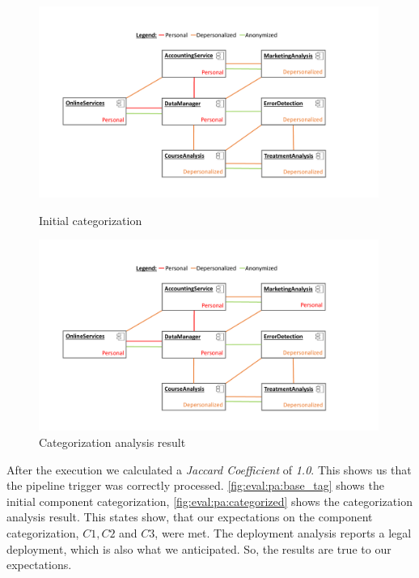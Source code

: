 \begin{figure}[h]
	\centering
	\begin{minipage}[b]{0.48\textwidth}		
		\includegraphics[trim = 20mm 10mm 40mm 10mm, clip, width=0.99\textwidth]{graphs/medSys_eval_pa_tagging_init}
		\caption{Initial categorization}
		\label{fig:eval:pa:base_tag}
	\end{minipage}
	\begin{minipage}[b]{0.48\textwidth}
		\includegraphics[trim = 20mm 10mm 40mm 10mm, clip, width=0.99\textwidth]{graphs/medSys_eval_pa_tagging_analysis}
		\caption{Categorization analysis result}
		\label{fig:eval:pa:categorized}
	\end{minipage}
\end{figure}

After the execution we calculated a \textit{Jaccard Coefficient} of \textit{1.0}. This shows us that the pipeline trigger was correctly processed. \autoref{fig:eval:pa:base_tag} shows the initial component categorization, \autoref{fig:eval:pa:categorized} shows the categorization analysis result. This states show, that our expectations on the component categorization, $C1, C2$ and $C3$, were met. The deployment analysis reports a legal deployment, which is also what we anticipated. So, the results are true to our expectations.


